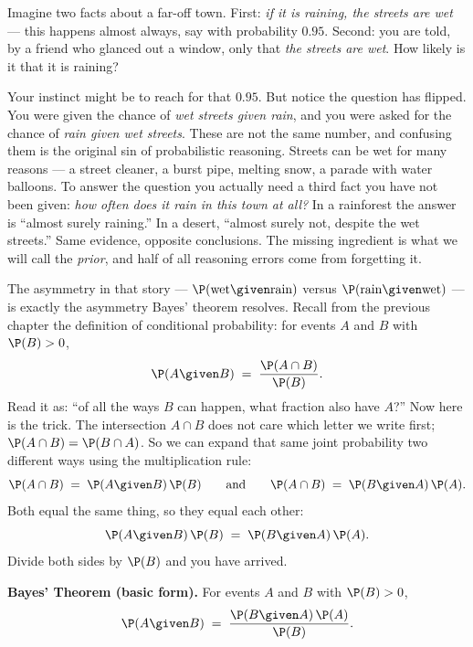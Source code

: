 \begin{intuitionbox}
Imagine two facts about a far-off town. First: \emph{if it is raining, the streets are
wet} --- this happens almost always, say with probability $0.95$. Second: you are told,
by a friend who glanced out a window, only that \emph{the streets are wet}. How likely
is it that it is raining?

Your instinct might be to reach for that $0.95$. But notice the question has flipped.
You were given the chance of \emph{wet streets given rain}, and you were asked for the
chance of \emph{rain given wet streets}. These are not the same number, and confusing
them is the original sin of probabilistic reasoning. Streets can be wet for many reasons
--- a street cleaner, a burst pipe, melting snow, a parade with water balloons. To
answer the question you actually need a third fact you have not been given: \emph{how
often does it rain in this town at all?} In a rainforest the answer is ``almost surely
raining.'' In a desert, ``almost surely not, despite the wet streets.'' Same evidence,
opposite conclusions. The missing ingredient is what we will call the \emph{prior}, and
half of all reasoning errors come from forgetting it.
\end{intuitionbox}

The asymmetry in that story --- $\P(\text{wet} \given \text{rain})$ versus
$\P(\text{rain} \given \text{wet})$ --- is exactly the asymmetry Bayes' theorem
resolves. Recall from the previous chapter the definition of conditional probability:
for events $A$ and $B$ with $\P(B) > 0$,
\[
  \P(A \given B) \;=\; \frac{\P(A \cap B)}{\P(B)}.
\]
Read it as: ``of all the ways $B$ can happen, what fraction also have $A$?'' Now here is
the trick. The intersection $A \cap B$ does not care which letter we write first;
$\P(A \cap B) = \P(B \cap A)$. So we can expand that same joint probability two different
ways using the multiplication rule:
\[
  \P(A \cap B) \;=\; \P(A \given B)\,\P(B)
  \qquad\text{and}\qquad
  \P(A \cap B) \;=\; \P(B \given A)\,\P(A).
\]
Both equal the same thing, so they equal each other:
\[
  \P(A \given B)\,\P(B) \;=\; \P(B \given A)\,\P(A).
\]
Divide both sides by $\P(B)$ and you have arrived.

\begin{formalbox}
\textbf{Bayes' Theorem (basic form).} For events $A$ and $B$ with $\P(B) > 0$,
\begin{equation}
  \P(A \given B) \;=\; \frac{\P(B \given A)\,\P(A)}{\P(B)}.
  \label{ch05:bayes-basic}
\end{equation}
\end{formalbox}

